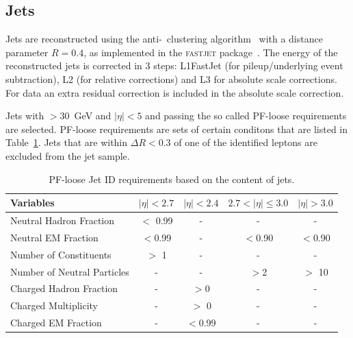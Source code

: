 \subsection{Jets}
\label{subsec:jets}
Jets are reconstructed using the anti-\kt~clustering algorithm~\cite{antikt}  with a distance parameter $R=0.4$, as implemented in the \textsc{fastjet}  package~\cite{Cacciari:fastjet1,Cacciari:fastjet2}. The energy of the reconstructed jets is corrected in 3 steps: L1FastJet (for pileup/underlying event subtraction), L2 (for relative corrections) and L3 for absolute scale corrections. For data an extra residual correction is included in the absolute scale correction.

Jets with \pt$>$30~GeV and $|\eta|<5$ and passing the so called PF-loose requirements are selected. PF-loose requirements are sets of certain conditons that are listed in Table~\ref{Table:pf-jet-loose-id}. Jets that are within $\Delta R < 0.3$ of one of the identified leptons are excluded from the jet sample. 
%
\begin{table}
\centering
\begin{tabular}[!htbp]{l c c c c}
\hline
{\textbf{Variables}}      &   $|\eta|<2.7$ & $|\eta|<2.4$  & $2.7 < |\eta| \leq 3.0$  & $|\eta| > 3.0$    \\
\hline
Neutral Hadron Fraction   &$   <$ 0.99  & -       & -       & -     \\
Neutral EM Fraction       &   $< $0.99  & -       & $< $0.90  & $< $0.90\\
Number of Constituents    &$   >$ 1     & -       & -       & -     \\
Number of Neutral Particles & -       & -       & $> $2     &$ >$ 10  \\
Charged Hadron Fraction   &   -       & $> $0     & -       & -     \\
Charged Multiplicity      &   -       &$ >$ 0     & -       & -     \\
Charged EM Fraction       &   -       & $< $0.99  & -       & -     \\
\hline
\end{tabular}
\caption{PF-loose Jet ID requirements based on the content of jets.}
\label{Table:pf-jet-loose-id}
\end{table}
%

